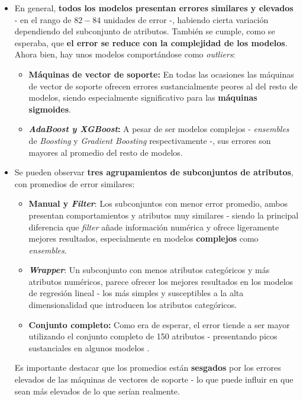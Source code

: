 \begin{itemize}[leftmargin=*, parsep=1pt, itemsep=0pt, topsep=1pt]
	\item En general, \textbf{todos los modelos presentan errores similares y elevados} - en el rango de $82-84$ unidades de error -, habiendo cierta variación dependiendo del subconjunto de atributos. También se cumple, como se esperaba, que \textbf{el error se reduce con la complejidad de los modelos}. Ahora bien, hay unos modelos comportándose como \textit{outliers}:
	\begin{itemize}[parsep=1pt, itemsep=0pt, topsep=1pt]
		\item \textbf{Máquinas de vector de soporte:} En todas las ocasiones las máquinas de vector de soporte ofrecen errores sustancialmente peores al del resto de modelos, siendo especialmente significativo para las \textbf{máquinas sigmoides}.
		\item \textbf{\textit{AdaBoost y XGBoost}:} A pesar de ser modelos complejos - \textit{ensembles} de \textit{Boosting} y \textit{Gradient Boosting} respectivamente -, sus errores son mayores al promedio del resto de modelos.
	\end{itemize}
	\item Se pueden observar \textbf{tres agrupamientos de subconjuntos de atributos}, con promedios de error similares:
	\begin{itemize}[parsep=1pt, itemsep=0pt, topsep=1pt]
		\item \textbf{Manual y \textit{Filter}}: Los subconjuntos con menor error promedio, ambos presentan comportamientos y atributos muy similares - siendo la principal diferencia que \textit{filter} añade información numérica y ofrece ligeramente mejores resultados, especialmente en modelos \textbf{complejos} como \textit{ensembles}.
		
		\item \textbf{\textit{Wrapper}}: Un subconjunto con menos atributos categóricos y más atributos numéricos, parece ofrecer los mejores resultados en los modelos de regresión lineal - los más simples y susceptibles a la alta dimensionalidad que introducen los atributos categóricos.
		
		\item \textbf{Conjunto completo:} Como era de esperar, el error tiende a ser mayor utilizando el conjunto completo de 150 atributos - presentando picos sustanciales en algunos modelos .
	\end{itemize}
	
	Es importante destacar que los promedios están \textbf{sesgados} por los errores elevados de las máquinas de vectores de soporte - lo que puede influir en que sean más elevados de lo que serían realmente.
\end{itemize}


